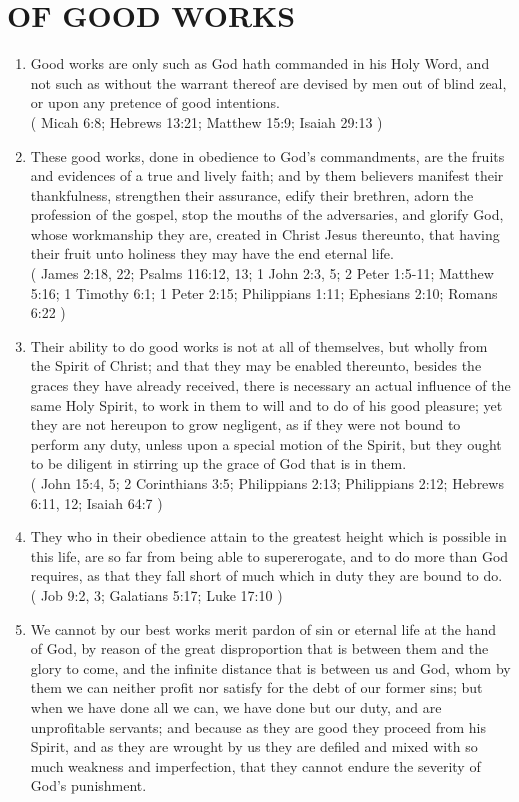 \documentclass[12pt,a4paper]{book}
\begin{document}
\chapter{OF GOOD WORKS}
\label{ch-goo-wor}
\begin{enumerate}
\item
\label{ch-goo-wor-1}
Good works are only such as God hath commanded in his Holy Word, and not such as without the warrant thereof are devised by men out of blind zeal, or upon any pretence of good intentions.\\
( Micah 6:8; Hebrews 13:21; Matthew 15:9; Isaiah 29:13 )
\item
\label{ch-goo-wor-2}
These good works, done in obedience to God's commandments, are the fruits and evidences of a true and lively faith; and by them believers manifest their thankfulness, strengthen their assurance, edify their brethren, adorn the profession of the gospel, stop the mouths of the adversaries, and glorify God, whose workmanship they are, created in Christ Jesus thereunto, that having their fruit unto holiness they may have the end eternal life.\\
( James 2:18, 22; Psalms 116:12, 13; 1 John 2:3, 5; 2 Peter 1:5-11; Matthew 5:16; 1 Timothy 6:1; 1 Peter 2:15; Philippians 1:11; Ephesians 2:10; Romans 6:22 )
\item
\label{ch-goo-wor-3}
Their ability to do good works is not at all of themselves, but wholly from the Spirit of Christ; and that they may be enabled thereunto, besides the graces they have already received, there is necessary an actual influence of the same Holy Spirit, to work in them to will and to do of his good pleasure; yet they are not hereupon to grow negligent, as if they were not bound to perform any duty, unless upon a special motion of the Spirit, but they ought to be diligent in stirring up the grace of God that is in them.\\
( John 15:4, 5; 2 Corinthians 3:5; Philippians 2:13; Philippians 2:12; Hebrews 6:11, 12; Isaiah 64:7 )
\item
\label{ch-goo-wor-4}
They who in their obedience attain to the greatest height which is possible in this life, are so far from being able to supererogate, and to do more than God requires, as that they fall short of much which in duty they are bound to do.\\
( Job 9:2, 3; Galatians 5:17; Luke 17:10 )
\item
\label{ch-goo-wor-5}
We cannot by our best works merit pardon of sin or eternal life at the hand of God, by reason of the great disproportion that is between them and the glory to come, and the infinite distance that is between us and God, whom by them we can neither profit nor satisfy for the debt of our former sins; but when we have done all we can, we have done but our duty, and are unprofitable servants; and because as they are good they proceed from his Spirit, and as they are wrought by us they are defiled and mixed with so much weakness and imperfection, that they cannot endure the severity of God's punishment.\\

\end{enumerate}
\end{document}
